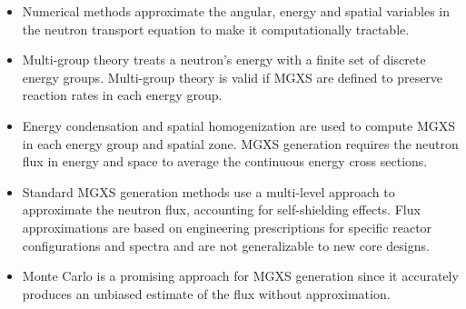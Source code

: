 \vfill
\begin{highlightsbox}[frametitle=Highlights]
\begin{itemize}
  \item Numerical methods approximate the angular, energy and spatial variables in the neutron transport equation to make it computationally tractable.
  \item Multi-group theory treats a neutron's energy with a finite set of discrete energy groups. Multi-group theory is valid if \ac{MGXS} are defined to preserve reaction rates in each energy group.
  \item Energy condensation and spatial homogenization are used to compute \ac{MGXS} in each energy group and spatial zone. \ac{MGXS} generation requires the neutron flux in energy and space to average the continuous energy cross sections.
  \item Standard \ac{MGXS} generation methods use a multi-level approach to approximate the neutron flux, accounting for self-shielding effects. Flux approximations are based on engineering prescriptions for specific reactor configurations and spectra and are not generalizable to new core designs.
  \item Monte Carlo is a promising approach for \ac{MGXS} generation since it accurately produces an unbiased estimate of the flux without approximation.
\end{itemize}
\end{highlightsbox}
\vfill